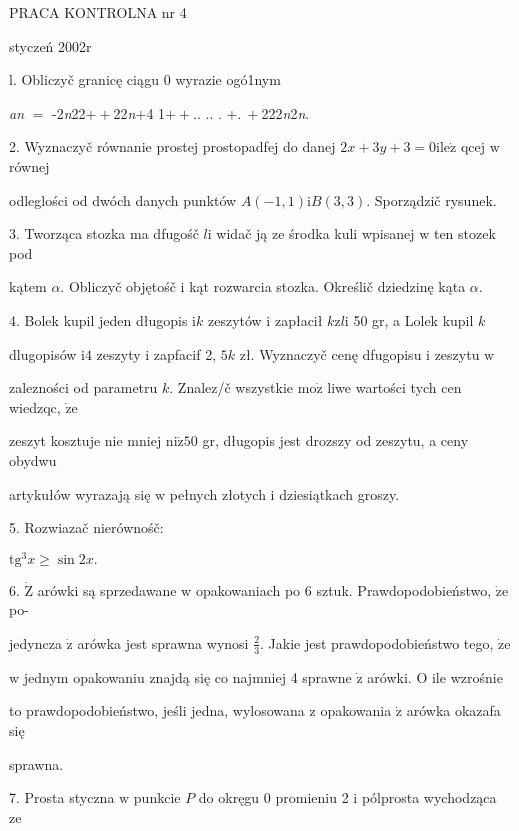 \documentclass[a4paper,12pt]{article}
\begin{document}
PRACA KONTROLNA nr 4

styczeń 2002r

l. Obliczyč granicę ciągu 0 wyrazie ogó1nym

{\it an} $=$ -2{\it n}22$++$22{\it n}$+$4 1$++$.. .. . $+.\ +$222{\it n}2{\it n}.

2. Wyznaczyč równanie prostej prostopadfej do danej $2x+3y+3=0\mathrm{i}\mathrm{l}\mathrm{e}\dot{\mathrm{z}}$ qcej $\mathrm{w}$ równej

odleglości od dwóch danych punktów $A(-1,1)\mathrm{i}B(3,3)$. Sporządzič rysunek.

3. Tworząca stozka ma dfugośč $l\mathrm{i}$ widač ją ze środka kuli wpisanej $\mathrm{w}$ ten stozek pod

kątem $\alpha$. Obliczyč objętośč $\mathrm{i}$ kąt rozwarcia stozka. Określič dziedzinę kąta $\alpha.$

4. Bolek kupil jeden długopis $\mathrm{i} k$ zeszytów $\mathrm{i}$ zapłacił $k\mathrm{z}l\mathrm{i}$ 50 gr, a Lolek kupil $k$

dlugopisów $\mathrm{i} 4$ zeszyty $\mathrm{i}$ zapfacif 2, $5k$ zł. Wyznaczyč cenę dfugopisu $\mathrm{i}$ zeszytu $\mathrm{w}$

zalezności od parametru $k$. Znalez/č wszystkie $\mathrm{m}\mathrm{o}\dot{\mathrm{z}}$ liwe wartości tych cen wiedzqc, $\dot{\mathrm{z}}\mathrm{e}$

zeszyt kosztuje nie mniej $\mathrm{n}\mathrm{i}\dot{\mathrm{z}} 50$ gr, długopis jest drozszy od zeszytu, a ceny obydwu

artykułów wyrazają się $\mathrm{w}$ pełnych złotych $\mathrm{i}$ dziesiątkach groszy.

5. Rozwiazač nierównośč:

$\mathrm{t}\mathrm{g}^{3}x\geq\sin 2x.$

6. $\dot{\mathrm{Z}}$ arówki są sprzedawane $\mathrm{w}$ opakowaniach po 6 sztuk. Prawdopodobieństwo, $\dot{\mathrm{z}}\mathrm{e}$ po-

jedyncza $\dot{\mathrm{z}}$ arówka jest sprawna wynosi $\displaystyle \frac{2}{3}$. Jakie jest prawdopodobieństwo tego, $\dot{\mathrm{z}}\mathrm{e}$

$\mathrm{w}$ jednym opakowaniu znajdą się co najmniej 4 sprawne $\dot{\mathrm{z}}$ arówki. $\mathrm{O}$ ile wzrośnie

to prawdopodobieństwo, jeśli jedna, wylosowana $\mathrm{z}$ opakowania $\dot{\mathrm{z}}$ arówka okazafa się

sprawna.

7. Prosta styczna $\mathrm{w}$ punkcie $P$ do okręgu $0$ promieniu 2 $\mathrm{i}$ pólprosta wychodząca ze
\end{document}
